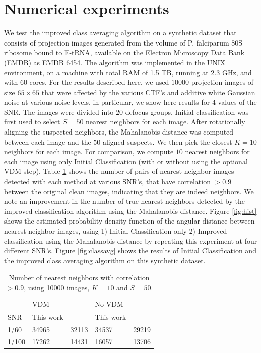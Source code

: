 \documentclass{article}
\begin{document}
\section{Numerical experiments}
\label{sec:num}

We test the improved class averaging algorithm on a synthetic dataset that consists of projection images generated from the volume of P. falciparum 80S ribosome bound to E-tRNA, available on the Electron Microscopy Data Bank (EMDB) as EMDB 6454. The algorithm was implemented in the UNIX environment, on a machine with total RAM of 1.5 TB, running at 2.3 GHz, and with 60 cores. 
For the results described here, we used $10000$ projection images of size $65 \times 65$ that were affected by the various CTF's and additive white Gaussian noise at various noise levels, in particular, we show here results for 4 values of the SNR. The images were divided into $20$ defocus groups. Initial classification was first used to select $S=50$ nearest neighbors for each image. After rotationally aligning the suspected neighbors, the Mahalanobis distance was computed between each image and the $50$ aligned suspects. We then pick the closest $K=10$ neighbors for each image. For comparison, we compute $10$ nearest neighbors for each image using only Initial Classification (with or without using the optional VDM step). Table \ref{table:1} shows the number of pairs of nearest neighbor images detected with each method at various SNR's, that have correlation $>0.9$ between the original clean images, indicating that they are indeed neighbors. We note an improvement in the number of true nearest neighbors detected by the improved classification algorithm using the Mahalanobis distance. Figure \ref{fig:hist} shows the estimated probability density function of the angular distance between nearest neighbor images, using 1) Initial Classification only 2) Improved classification using the Mahalanobis distance by repeating this experiment at four different SNR's. Figure \ref{fig:classavg} shows the results of Initial Classification and the improved class averaging algorithm on this synthetic dataset.

\begin{table}[]
\centering
\label{table:1}
\begin{tabular}{lllll}
      & \multicolumn{2}{l}{VDM} & \multicolumn{2}{l}{No VDM} \\ \cline{2-5} 
SNR   & This work        & \cite{zhao}        & This work          & \cite{zhao}         \\ \cline{2-5} 
1/60  & 34965          & 32113          & 34537            & 29219       \\
1/100 & 17262      & 14431      & 16057        & 13706        \\ \cline{2-5} 
\end{tabular}
\caption{Number of nearest neighbors with correlation $>0.9$, 
using 10000 images, $K=10$ and $S=50$.
}
\end{table}
\end{document}
